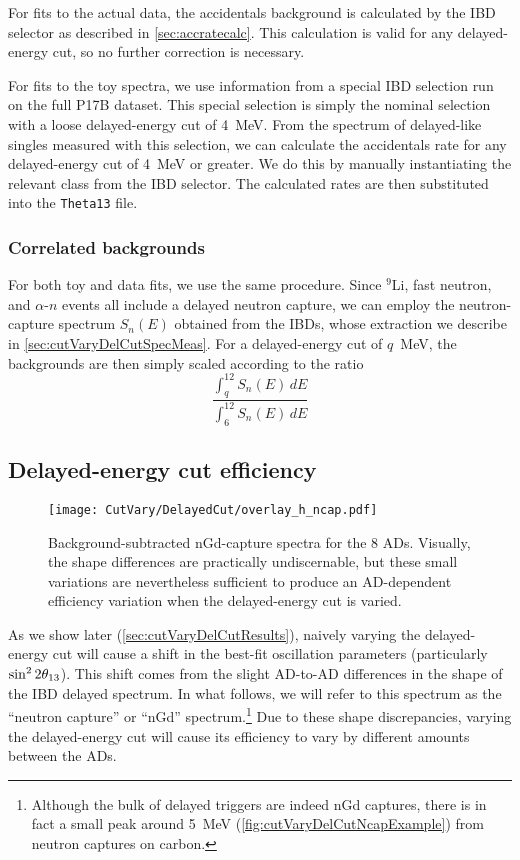 \documentclass[../thesis.tex]{subfiles}
\begin{document}
For fits to the actual data, the accidentals background is calculated by the IBD selector as described in \autoref{sec:accratecalc}. This calculation is valid for any delayed-energy cut, so no further correction is necessary.

For fits to the toy spectra, we use information from a special IBD selection run on the full P17B dataset. This special selection is simply the nominal selection with a loose delayed-energy cut of 4~MeV. From the spectrum of delayed-like singles measured with this selection, we can calculate the accidentals rate for any delayed-energy cut of 4~MeV or greater. We do this by manually instantiating the relevant class from the IBD selector. The calculated rates are then substituted into the \texttt{Theta13} file.

\subsubsection{Correlated backgrounds}

For both toy and data fits, we use the same procedure. Since $^9$Li, fast neutron, and $\alpha$-$n$ events all include a delayed neutron capture, we can employ the neutron-capture spectrum $S_n(E)$ obtained from the IBDs, whose extraction we describe in \autoref{sec:cutVaryDelCutSpecMeas}. For a delayed-energy cut of $q$~MeV, the backgrounds are then simply scaled according to the ratio
\begin{equation}
  \label{eq:cutVaryDelCutCorrBkgScale}
  \frac{\int_q^{12} S_n(E)\,dE}{\int_6^{12} S_n(E)\,dE}
\end{equation}

\subsection{Delayed-energy cut efficiency}
\label{sec:cutVaryDelCutEff}

\begin{figure}[ht]
  \texttt{[image: CutVary/DelayedCut/overlay\_h\_ncap.pdf]}
  \caption{Background-subtracted nGd-capture spectra for the 8 ADs. Visually, the shape differences are practically undiscernable, but these small variations are nevertheless sufficient to produce an AD-dependent efficiency variation when the delayed-energy cut is varied.}
  \label{fig:cutVaryDelCutSpecOverlay}
\end{figure}

As we show later (\autoref{sec:cutVaryDelCutResults}), naively varying the delayed-energy cut will cause a shift in the best-fit oscillation parameters (particularly $\sin^2 2\theta_{13}$). This shift comes from the slight AD-to-AD differences in the shape of the IBD delayed spectrum. In what follows, we will refer to this spectrum as the ``neutron capture'' or ``nGd'' spectrum.\footnote{Although the bulk of delayed triggers are indeed nGd captures, there is in fact a small peak around 5~MeV (\autoref{fig:cutVaryDelCutNcapExample}) from neutron captures on carbon.} Due to these shape discrepancies, varying the delayed-energy cut will cause its efficiency to vary by different amounts between the ADs.
\end{document}
